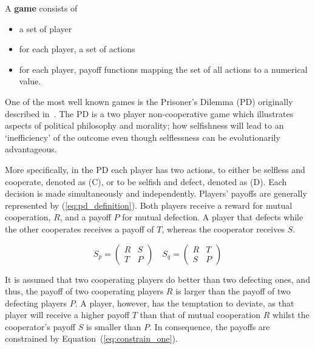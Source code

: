\begin{definition}
A \textbf{game} consists of
\begin{itemize}
    \item a set of player
    \item for each player, a set of actions
    \item for each player, payoff functions mapping the set of all actions to a numerical value.
\end{itemize}
\end{definition}

One of the most well known games is the Prisoner's Dilemma (PD) originally
described in~\cite{Flood1958}. The PD is a two player non-cooperative game which
illustrates aspects of political philosophy and morality; how selfishness will
lead to an `inefficiency' of the outcome even though selflessness can be
evolutionarily advantageous.

More specifically, in the PD each player has two actions, to either be selfless
and cooperate, denoted as (C), or to be selfish and defect, denoted as (D). Each
decision is made simultaneously and independently. Players' payoffs are
generally represented by (\ref{eq:pd_definition}). Both players receive a reward
for mutual cooperation, \(R\), and a payoff \(P\) for mutual defection. A player
that defects while the other cooperates receives a payoff of \(T\), whereas the
cooperator receives \(S\).

\begin{equation}\label{eq:pd_definition}
    S_p =
    \begin{pmatrix}
        R & S  \\
        T & P
    \end{pmatrix}
    \quad
    S_q =
    \begin{pmatrix}
        R & T  \\
        S & P
    \end{pmatrix}
\end{equation}

It is assumed that two cooperating players do better than two defecting ones,
and thus, the payoff of two cooperating players \(R\) is
larger than the payoff of two defecting players \(P\). A player, however, has the
temptation to deviate, as that player will receive a higher payoff \(T\) than
that of mutual cooperation \(R\) whilst the cooperator's payoff \(S\) is smaller than
\(P\). In consequence, the payoffs are constrained by
Equation~(\ref{eq:constrain_one}).

